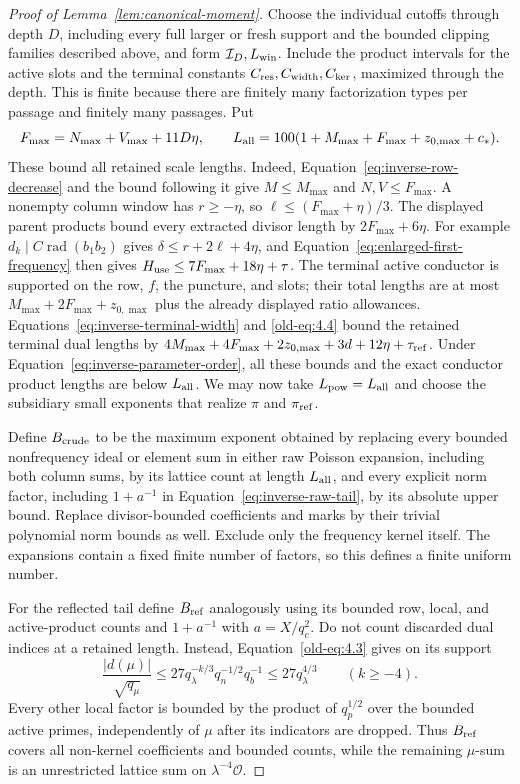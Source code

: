 \documentclass[11pt,a4paper]{article}
\numberwithin{equation}{section}
\numberwithin{figure}{section}
\theoremstyle{definition}
\theoremstyle{remark}
\begin{document}
\begin{proof}[Proof of Lemma~\ref{lem:canonical-moment}]
Choose the individual cutoffs through depth \(D\), including every full
larger or fresh support and the bounded clipping families described
above, and form \(\mathcal I_D,L_{\rm win}\).  Include the product
intervals for the active slots and the terminal constants
\(C_{\rm res},C_{\rm width},C_{\rm ker}\), maximized through the depth.
This is finite because there are finitely many factorization types per
passage and finitely many passages.  Put
\[
 F_{\max}=N_{\max}+V_{\max}+11D\eta,\qquad
 L_{\rm all}=100(1+M_{\max}+F_{\max}+z_{0,\max}+c_*).
\]
These bound all retained scale lengths.  Indeed,
Equation~\eqref{eq:inverse-row-decrease} and the bound following it give
\(M\le M_{\max}\) and \(N,V\le F_{\max}\).  A nonempty column window has
\(r\ge-\eta\), so \(\ell\le(F_{\max}+\eta)/3\).  The displayed parent
products bound every extracted divisor length by \(2F_{\max}+6\eta\).
For example \(d_k\mid C\operatorname{rad}(b_1b_2)\) gives
\(\delta\le r+2\ell+4\eta\), and Equation~\eqref{eq:enlarged-first-frequency}
then gives \(H_{\rm use}\le7F_{\max}+18\eta+\tau\).  The terminal active
conductor is supported on the row, \(f\), the puncture, and slots; their
total lengths are at most \(M_{\max}+2F_{\max}+z_{0,\max}\) plus the
already displayed ratio allowances.  Equations~\eqref{eq:inverse-terminal-width}
and \eqref{old-eq:4.4} bound the retained terminal dual lengths by
\(4M_{\max}+4F_{\max}+2z_{0,\max}+3d+12\eta+\tau_{\rm ref}\).
Under Equation~\eqref{eq:inverse-parameter-order}, all these bounds and
the exact conductor product lengths are below \(L_{\rm all}\).
We may now take \(L_{\rm pow}=L_{\rm all}\) and choose the subsidiary
small exponents that realize \(\pi\) and \(\pi_{\rm ref}\).

Define \(B_{\rm crude}\) to be the maximum exponent obtained by replacing
every bounded nonfrequency ideal or element sum in either raw Poisson
expansion, including both column sums, by its lattice count at length
\(L_{\rm all}\), and every explicit norm factor, including \(1+a^{-1}\)
in Equation~\eqref{eq:inverse-raw-tail}, by its absolute upper bound.
Replace divisor-bounded coefficients and marks by their trivial polynomial
norm bounds as well.
Exclude only the frequency kernel itself.  The expansions contain a
fixed finite number of factors, so this defines a finite uniform number.

For the reflected tail define \(B_{\rm ref}\) analogously using its bounded
row, local, and active-product counts and \(1+a^{-1}\) with \(a=X/q_c^2\).
Do not count discarded dual indices at a retained length.  Instead,
Equation~\eqref{old-eq:4.3} gives on its support
\[
 \frac{|d(\mu)|}{\sqrt{q_\mu}}
 \le27q_\lambda^{-k/3}q_n^{-1/2}q_b^{-1}
 \le27q_\lambda^{4/3}\qquad(k\ge-4).
\]
Every other local factor is bounded by the product of \(q_p^{1/2}\) over
the bounded active primes, independently of \(\mu\) after its indicators
are dropped.  Thus \(B_{\rm ref}\) covers all non-kernel coefficients and
bounded counts, while the remaining \(\mu\)-sum is an unrestricted
lattice sum on \(\lambda^{-4}\mathcal O\).


\end{proof}
\end{document}
